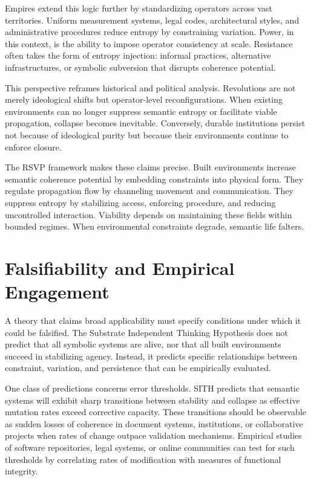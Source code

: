\documentclass[11pt,oneside]{article}
\begin{document}
Empires extend this logic further by standardizing operators across vast territories. Uniform measurement systems, legal codes, architectural styles, and administrative procedures reduce entropy by constraining variation. Power, in this context, is the ability to impose operator consistency at scale. Resistance often takes the form of entropy injection: informal practices, alternative infrastructures, or symbolic subversion that disrupts coherence potential.

This perspective reframes historical and political analysis. Revolutions are not merely ideological shifts but operator-level reconfigurations. When existing environments can no longer suppress semantic entropy or facilitate viable propagation, collapse becomes inevitable. Conversely, durable institutions persist not because of ideological purity but because their environments continue to enforce closure.

The RSVP framework makes these claims precise. Built environments increase semantic coherence potential by embedding constraints into physical form. They regulate propagation flow by channeling movement and communication. They suppress entropy by stabilizing access, enforcing procedure, and reducing uncontrolled interaction. Viability depends on maintaining these fields within bounded regimes. When environmental constraints degrade, semantic life falters.

\section{Falsifiability and Empirical Engagement} 

A theory that claims broad applicability must specify conditions under which it could be falsified. The Substrate Independent Thinking Hypothesis does not predict that all symbolic systems are alive, nor that all built environments succeed in stabilizing agency. Instead, it predicts specific relationships between constraint, variation, and persistence that can be empirically evaluated.

One class of predictions concerns error thresholds. SITH predicts that semantic systems will exhibit sharp transitions between stability and collapse as effective mutation rates exceed corrective capacity. These transitions should be observable as sudden losses of coherence in document systems, institutions, or collaborative projects when rates of change outpace validation mechanisms. Empirical studies of software repositories, legal systems, or online communities can test for such thresholds by correlating rates of modification with measures of functional integrity.
\end{document}
